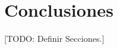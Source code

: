 \documentclass{subfiles}
\begin{document}
  \chapter{Conclusiones}
  \label{chap:conclusions}

    [TODO: Definir Secciones.]
\end{document}
